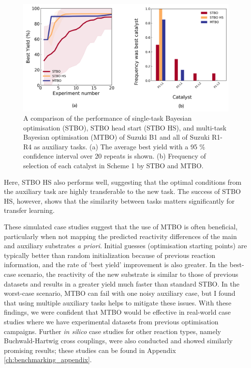 \begin{figure}
    \includegraphics[width=\textwidth]{gfx/Chapter04/catalyst_optimization.png}

    \caption{A comparison of the performance of single-task Bayesian optimisation (STBO), STBO head start (STBO HS), and multi-task Bayesian optimisation (MTBO) of Suzuki B1 and all of Suzuki R1-R4 as auxiliary tasks. (a)  The average best yield with a 95 \% confidence interval over 20 repeats is shown.  (b) Frequency of selection of each catalyst in Scheme 1 by STBO and MTBO.}
    \label{fig:baumgartner_suzuki_reizman_suzuki_all_cotraining_optimisation}
\end{figure}

Here, STBO HS also performs well, suggesting that the optimal conditions from the auxiliary task are highly transferable to the new task. The success of STBO HS, however, shows that the similarity between tasks matters significantly for transfer learning.  

These simulated case studies suggest that the use of MTBO is often beneficial, particularly when not mapping the predicted reactivity differences of the main and auxiliary substrates \textit{a priori}. Initial guesses (optimisation starting points) are typically better than random initialization because of previous reaction information, and the rate of `best yield' improvement is also greater. In the best-case scenario, the reactivity of the new substrate is similar to those of previous datasets and results in a greater yield much faster than standard STBO. In the worst-case scenario, MTBO can fail with one noisy auxiliary case, but I found that using multiple auxiliary tasks helps to mitigate these issues.  With these findings, we were confident that MTBO would be effective in real-world case studies where we have experimental datasets from previous optimisation campaigns. Further \textit{in silico} case studies for other reaction types, namely Buchwald-Hartwig cross couplings, were also conducted and showed similarly promising results; these studies can be found in Appendix \ref{ch:benchmarking_appendix}.

